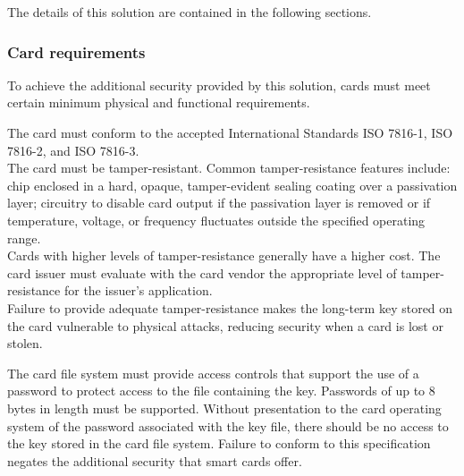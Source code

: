 The details of this solution are contained in the following sections.


\subsubsection{Card requirements}
To achieve the additional security provided by this solution, cards
must meet certain minimum physical and functional requirements.

\begin{htmllist}

    
    The card must conform to the accepted International Standards ISO
    7816-1, ISO 7816-2, and ISO 7816-3.\\
    
    The card must be tamper-resistant. Common tamper-resistance features
    include: chip enclosed in a hard, opaque, tamper-evident sealing
    coating over a passivation layer; circuitry to disable card output if
    the passivation layer is removed or if temperature, voltage, or
    frequency fluctuates outside the specified operating range.\\
    
    Cards with higher levels of tamper-resistance generally have a higher
    cost. The card issuer must evaluate with the card vendor the
    appropriate level of tamper-resistance for the issuer's application.\\
    
    Failure to provide adequate tamper-resistance makes the long-term key
    stored on the card vulnerable to physical attacks, reducing security
    when a card is lost or stolen.\\

    
    The card file system must provide access controls that support the use
    of a password to protect access to the file containing the key.
    Passwords of up to 8 bytes in length must be supported. Without
    presentation to the card operating system of the password associated
    with the key file, there should be no access to the key stored in the
    card file system. Failure to conform to this specification negates the
    additional security that smart cards offer.\\
    

\end{htmllist}
